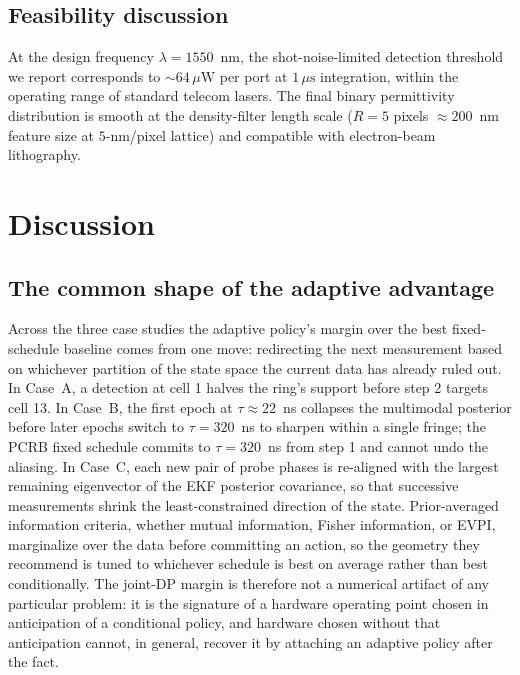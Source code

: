 \documentclass[11pt,a4paper,onecolumn]{article}
\begin{document}
\subsection{Feasibility discussion}

At the design frequency $\lambda = 1550$~nm, the shot-noise-limited detection threshold we report corresponds to $\sim 64\,\mu\mathrm{W}$ per port at $1\,\mu\mathrm{s}$ integration, within the operating range of standard telecom lasers.  The final binary permittivity distribution is smooth at the density-filter length scale ($R = 5$ pixels $\approx 200$~nm feature size at $5$-nm/pixel lattice) and compatible with electron-beam lithography.

\section{Discussion}
\label{sec:discussion}

\subsection{The common shape of the adaptive advantage}

Across the three case studies the adaptive policy's margin over the best fixed-schedule baseline comes from one move: redirecting the next measurement based on whichever partition of the state space the current data has already ruled out.  In Case~A, a detection at cell 1 halves the ring's support before step 2 targets cell 13.  In Case~B, the first epoch at $\tau \approx 22$~ns collapses the multimodal posterior before later epochs switch to $\tau = 320$~ns to sharpen within a single fringe; the PCRB fixed schedule commits to $\tau = 320$~ns from step 1 and cannot undo the aliasing.  In Case~C, each new pair of probe phases is re-aligned with the largest remaining eigenvector of the EKF posterior covariance, so that successive measurements shrink the least-constrained direction of the state.  Prior-averaged information criteria, whether mutual information, Fisher information, or EVPI, marginalize over the data before committing an action, so the geometry they recommend is tuned to whichever schedule is best on average rather than best conditionally.  The joint-DP margin is therefore not a numerical artifact of any particular problem: it is the signature of a hardware operating point chosen in anticipation of a conditional policy, and hardware chosen without that anticipation cannot, in general, recover it by attaching an adaptive policy after the fact.
\end{document}

